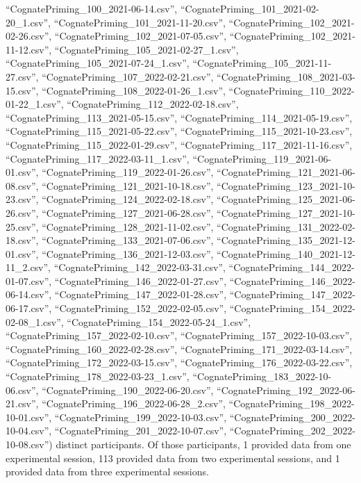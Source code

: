 \documentclass[
  letterpaper,
  DIV=11,
  numbers=noendperiod]{scrartcl}
\begin{document}
``CognatePriming\_100\_2021-06-14.csv'',
``CognatePriming\_101\_2021-02-20\_1.csv'',
``CognatePriming\_101\_2021-11-20.csv'',
``CognatePriming\_102\_2021-02-26.csv'',
``CognatePriming\_102\_2021-07-05.csv'',
``CognatePriming\_102\_2021-11-12.csv'',
``CognatePriming\_105\_2021-02-27\_1.csv'',
``CognatePriming\_105\_2021-07-24\_1.csv'',
``CognatePriming\_105\_2021-11-27.csv'',
``CognatePriming\_107\_2022-02-21.csv'',
``CognatePriming\_108\_2021-03-15.csv'',
``CognatePriming\_108\_2022-01-26\_1.csv'',
``CognatePriming\_110\_2022-01-22\_1.csv'',
``CognatePriming\_112\_2022-02-18.csv'',
``CognatePriming\_113\_2021-05-15.csv'',
``CognatePriming\_114\_2021-05-19.csv'',
``CognatePriming\_115\_2021-05-22.csv'',
``CognatePriming\_115\_2021-10-23.csv'',
``CognatePriming\_115\_2022-01-29.csv'',
``CognatePriming\_117\_2021-11-16.csv'',
``CognatePriming\_117\_2022-03-11\_1.csv'',
``CognatePriming\_119\_2021-06-01.csv'',
``CognatePriming\_119\_2022-01-26.csv'',
``CognatePriming\_121\_2021-06-08.csv'',
``CognatePriming\_121\_2021-10-18.csv'',
``CognatePriming\_123\_2021-10-23.csv'',
``CognatePriming\_124\_2022-02-18.csv'',
``CognatePriming\_125\_2021-06-26.csv'',
``CognatePriming\_127\_2021-06-28.csv'',
``CognatePriming\_127\_2021-10-25.csv'',
``CognatePriming\_128\_2021-11-02.csv'',
``CognatePriming\_131\_2022-02-18.csv'',
``CognatePriming\_133\_2021-07-06.csv'',
``CognatePriming\_135\_2021-12-01.csv'',
``CognatePriming\_136\_2021-12-03.csv'',
``CognatePriming\_140\_2021-12-11\_2.csv'',
``CognatePriming\_142\_2022-03-31.csv'',
``CognatePriming\_144\_2022-01-07.csv'',
``CognatePriming\_146\_2022-01-27.csv'',
``CognatePriming\_146\_2022-06-14.csv'',
``CognatePriming\_147\_2022-01-28.csv'',
``CognatePriming\_147\_2022-06-17.csv'',
``CognatePriming\_152\_2022-02-05.csv'',
``CognatePriming\_154\_2022-02-08\_1.csv'',
``CognatePriming\_154\_2022-05-24\_1.csv'',
``CognatePriming\_157\_2022-02-10.csv'',
``CognatePriming\_157\_2022-10-03.csv'',
``CognatePriming\_160\_2022-02-28.csv'',
``CognatePriming\_171\_2022-03-14.csv'',
``CognatePriming\_172\_2022-03-15.csv'',
``CognatePriming\_176\_2022-03-22.csv'',
``CognatePriming\_178\_2022-03-23\_1.csv'',
``CognatePriming\_183\_2022-10-06.csv'',
``CognatePriming\_190\_2022-06-20.csv'',
``CognatePriming\_192\_2022-06-21.csv'',
``CognatePriming\_196\_2022-06-28\_2.csv'',
``CognatePriming\_198\_2022-10-01.csv'',
``CognatePriming\_199\_2022-10-03.csv'',
``CognatePriming\_200\_2022-10-04.csv'',
``CognatePriming\_201\_2022-10-07.csv'',
``CognatePriming\_202\_2022-10-08.csv'') distinct participants. Of those
participants, 1 provided data from one experimental session, 113
provided data from two experimental sessions, and 1 provided data from
three experimental sessions.
\end{document}
